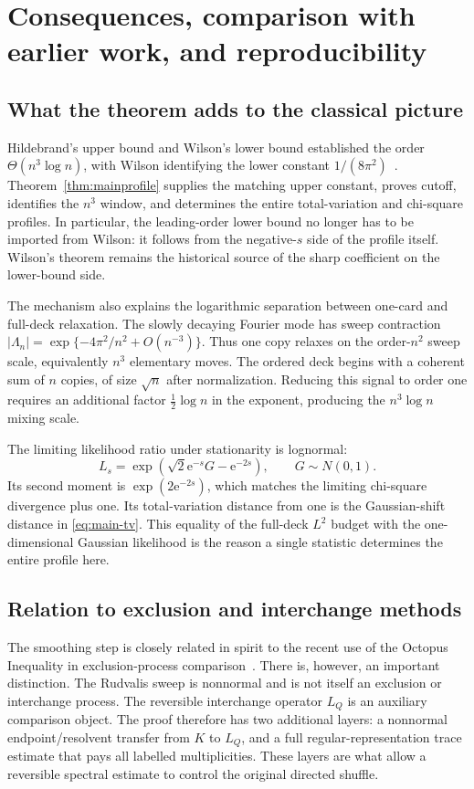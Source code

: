 \documentclass[11pt]{article}
\theoremstyle{remark}
\newcommand{\ee}{\mathrm e}
\begin{document}
\section{Consequences, comparison with earlier work, and reproducibility}\label{sec:discussion}

\subsection{What the theorem adds to the classical picture}
Hildebrand's upper bound and Wilson's lower bound established the order $\Theta(n^3\log n)$, with Wilson identifying the lower constant $1/(8\pi^2)$~\cite{Hildebrand1990,Wilson2003}.  Theorem~\ref{thm:mainprofile} supplies the matching upper constant, proves cutoff, identifies the $n^3$ window, and determines the entire total-variation and chi-square profiles.  In particular, the leading-order lower bound no longer has to be imported from Wilson: it follows from the negative-$s$ side of the profile itself.  Wilson's theorem remains the historical source of the sharp coefficient on the lower-bound side.

The mechanism also explains the logarithmic separation between one-card and full-deck relaxation.  The slowly decaying Fourier mode has sweep contraction
$|\Lambda_n|=\exp\{-4\pi^2/n^2+O(n^{-3})\}$.  Thus one copy relaxes on the order-$n^2$ sweep scale, equivalently $n^3$ elementary moves.  The ordered deck begins with a coherent sum of $n$ copies, of size $\sqrt n$ after normalization.  Reducing this signal to order one requires an additional factor $\frac12\log n$ in the exponent, producing the $n^3\log n$ mixing scale.

The limiting likelihood ratio under stationarity is lognormal:
\[
 L_s=\exp\!\left(\sqrt2\ee^{-s}G-\ee^{-2s}\right),\qquad G\sim N(0,1).
\]
Its second moment is $\exp(2\ee^{-2s})$, which matches the limiting chi-square divergence plus one.  Its total-variation distance from one is the Gaussian-shift distance in \eqref{eq:main-tv}.  This equality of the full-deck $L^2$ budget with the one-dimensional Gaussian likelihood is the reason a single statistic determines the entire profile here.

\subsection{Relation to exclusion and interchange methods}
The smoothing step is closely related in spirit to the recent use of the Octopus Inequality in exclusion-process comparison~\cite{HKS}.  There is, however, an important distinction.  The Rudvalis sweep is nonnormal and is not itself an exclusion or interchange process.  The reversible interchange operator $L_Q$ is an auxiliary comparison object.  The proof therefore has two additional layers: a nonnormal endpoint/resolvent transfer from $K$ to $L_Q$, and a full regular-representation trace estimate that pays all labelled multiplicities.  These layers are what allow a reversible spectral estimate to control the original directed shuffle.
\end{document}
